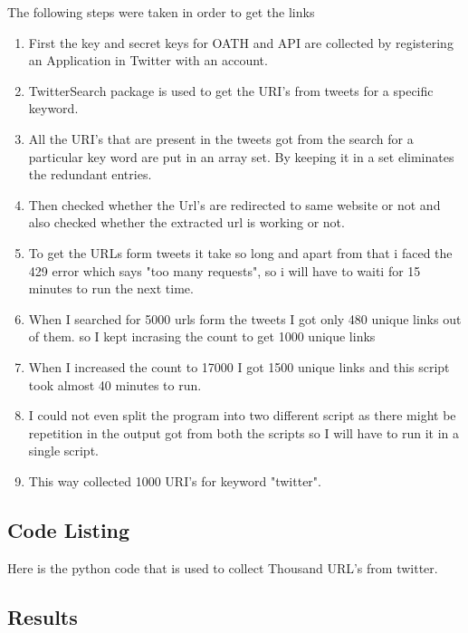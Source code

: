 The following steps were taken in order to get the links 
\begin{enumerate}
\item First the key and secret keys for OATH and API are collected by registering an Application in Twitter with an account.
\item TwitterSearch package is used to get the URI's from tweets for a specific keyword.
\item All the URI's that are present in the tweets got from the search for a particular key word are put in an array set. By keeping it in a set eliminates the redundant entries. 
\item Then checked whether the Url's are redirected to same website or not and also checked whether the extracted url is working or not. 
\item To get the URLs form tweets it take so long and apart from that i faced the 429 error which says "too many requests", so i will have to waiti for 15 minutes to run the next time. 
\item When I searched for 5000 urls form the tweets I got only 480 unique links out of them. so I kept incrasing the count to get 1000 unique links
\item When I increased the count to 17000 I got 1500 unique links and this script took almost 40 minutes to run. 
\item I could not even split the program into two different script as there might be repetition in the output got from both the scripts so I will have to run it in a single script.    
\item This way collected 1000 URI's for keyword "twitter". 
\end{enumerate}
\newpage
\subsection{Code Listing}
Here is the python code that is used to collect Thousand URL's from twitter. 



\newpage
\subsection{Results}




